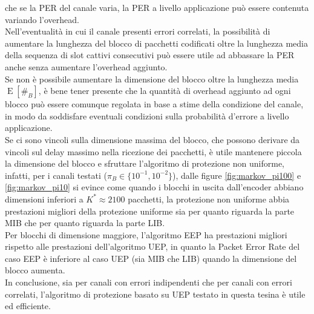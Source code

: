 \documentclass[italian, a4paper, 12pt]{article}
\newcommand{\E}[1]{\operatorname{E}\left[#1\right]}
\newcommand{\EnB}{\E{\#_B}}
\begin{document}
che se la PER del canale varia, la PER a livello applicazione può essere contenuta
variando l'overhead.\\
Nell'eventualità in cui il canale presenti errori correlati,
la possibilità di aumentare la lunghezza del blocco di pacchetti codificati oltre la lunghezza media della sequenza
di slot cattivi consecutivi può essere utile ad abbassare la PER anche senza aumentare l'overhead aggiunto.\\
Se non è possibile aumentare la dimensione del blocco oltre la lunghezza media $\EnB$, è bene 
tener presente che la quantità di overhead aggiunto ad ogni blocco può essere comunque
regolata in base a stime della condizione del canale, in modo da soddisfare eventuali condizioni
sulla probabilità d'errore a livello applicazione.\\
Se ci sono vincoli sulla dimensione massima del blocco, che possono derivare 
da vincoli sul delay massimo nella ricezione dei pacchetti, è utile mantenere 
piccola la dimensione del blocco e sfruttare l'algoritmo di protezione non uniforme, infatti,
per i canali testati ($\pi_B \in\{10^{-1},10^{-2}\}$), dalle figure \ref{fig:markov_pi100} 
e \ref{fig:markov_pi10} si evince come quando i blocchi 
in uscita dall'encoder abbiano dimensioni inferiori a $K^* \approx 2100$ pacchetti, 
la protezione non uniforme abbia prestazioni migliori della protezione uniforme sia per quanto riguarda la
parte MIB che per quanto riguarda la parte LIB.\\
Per blocchi di dimensione maggiore, l'algoritmo EEP ha prestazioni 
migliori rispetto alle prestazioni dell'algoritmo UEP, in quanto la Packet
Error Rate del caso EEP è inferiore al caso UEP (sia MIB che LIB) quando la dimensione del blocco aumenta.\\
In conclusione, sia per canali con errori indipendenti che per canali con errori correlati, l'algoritmo di protezione basato su UEP testato in questa tesina è utile ed efficiente.

\printbibliography[heading=bibnumbered, title=Bibliografia]
\end{document}
